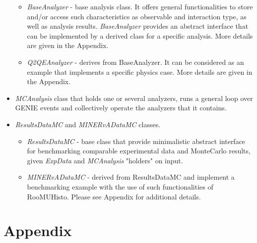 \begin{itemize}
{\begin{itemize} 
\item{ {\it BaseAnalyzer} - base analysis class. It offers general functionalities to store and/or access
such characteristics as observable and interaction type, as well as analysis results. 
{\it BaseAnalyzer} provides an abstract interface that can be implemented by a derived class for 
a specific analysis. More details are given in the Appendix.
}
\item{ {\it Q2QEAnalyzer} - derives from BaseAnalyzer. It can be considered as an example that implements 
a specific physics case. 
More details are given in the Appendix.}
\end{itemize}
}
\item{ {\it MCAnalysis} class that holds one or several analyzers, runs a general loop over GENIE events and 
collectively operate the analyzers that it contains.}
\item{ {\it ResultsDataMC} and {\it MINERvADataMC} classes.
\begin{itemize}
\item{ {\it ResultsDataMC} - base class that provide minimalistic abstract interface for benchmarking comparable
experimental data and MonteCarlo results, given {\it ExpData} and {\it MCAnalysis} "holders" on input. 
}
\item{ {\it MINERvADataMC} - derived from ResultsDataMC and implement a benchmarking example with the use of
such functionalities of RooMUHisto.
Please see Appendix for additional details.
}
\end{itemize}
}
\end{itemize}

\section{Appendix}

